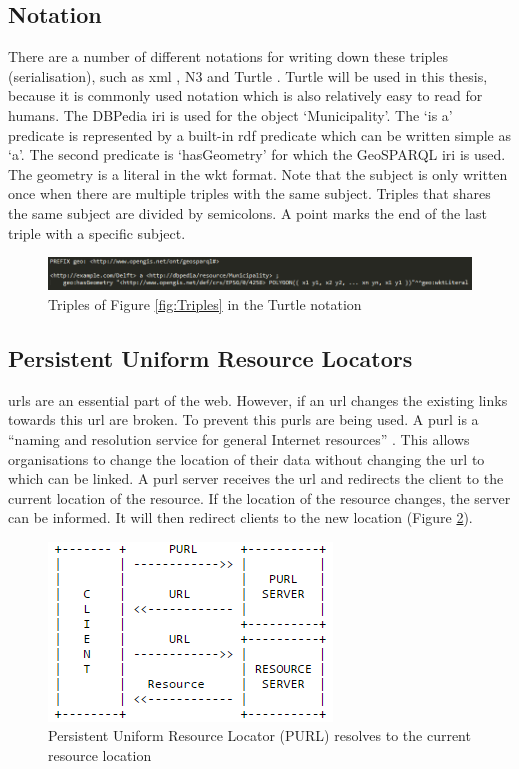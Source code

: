 \subsection{Notation}
There are a number of different notations for writing down these triples (serialisation), such as \ac{xml} \citep{LD:W3C3}, N3 \citep{LD:W3C5} and Turtle \citep{LD:W3C4}. Turtle will be used in this thesis, because it is commonly used notation which is also relatively easy to read for humans. The DBPedia \ac{iri} is used for the object `Municipality'. The `is a' predicate is represented by a built-in \ac{rdf} predicate which can be written simple as `a'. The second predicate is `hasGeometry' for which the GeoSPARQL \ac{iri} is used. The geometry is a literal in the \ac{wkt} format. Note that the subject is only written once when there are multiple triples with the same subject. Triples that shares the same subject are divided by semicolons. A point marks the end of the last triple with a specific subject.

\begin{figure}
	\centering
	\includegraphics[width=1\linewidth]{figs/Turtle.png}
	\caption{Triples of Figure \ref{fig:Triples} in the Turtle notation}
	\label{fig:Turtle}
\end{figure} 

\subsection{Persistent Uniform Resource Locators}
\acp{url} are an essential part of the web. However, if an \ac{url} changes the existing links towards this \ac{url} are broken. To prevent this \acp{purl} are being used. A \acl{purl} is a \enquote{naming and resolution service for general Internet resources} \citep{LD:PURL}. This allows organisations to change the location of their data without changing the \ac{url} to which can be linked. A \ac{purl} server receives the \ac{url} and redirects the client to the current location of the resource. If the location of the resource 
changes, the server can be informed. It will then redirect clients to the new location (Figure \ref{fig:PURL}).  

\begin{figure}
	\centering
	\includegraphics[width=0.6\linewidth]{figs/purl.png}
	\caption{Persistent Uniform Resource Locator (PURL) resolves to the current resource location \citep{LD:PURL}}
	\label{fig:PURL}
\end{figure} 

